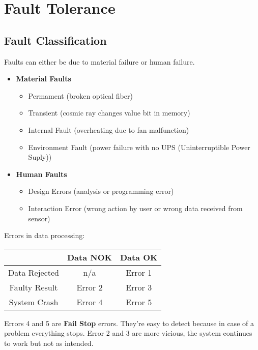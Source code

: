 \documentclass[../main.tex]{subfiles}
\begin{document}
\chapter{Fault Tolerance}

\section{Fault Classification}
Faults can either be due to material failure or human failure. 
\begin{itemize}
	\item \textbf{Material Faults}
	\begin{itemize}
		\item Permament (broken optical fiber)
		\item Transient (cosmic ray changes value bit in memory)
		\item Internal Fault (overheating due to fan malfunction)
		\item Environment Fault (power failure with no UPS (Uninterruptible Power Suply))
	\end{itemize}
	\item \textbf{Human Faults}
	\begin{itemize}
		\item Design Errors (analysis or programming error)
		\item Interaction Error (wrong action by user or wrong data received from sensor)
	\end{itemize}
\end{itemize}
Errors in data processing:
\begin{center}
\begin{tabular}{|c|c|c|}
\hline 
 & Data NOK & Data OK \\ 
\hline 
Data Rejected & n/a & Error 1 \\ 
\hline 
Faulty Result & Error 2 & Error 3 \\ 
\hline 
System Crash & Error 4 & Error 5 \\ 
\hline 
\end{tabular} 
\end{center}
Errors 4 and 5 are  \textbf{Fail Stop} errors. They're easy to detect because in case of a problem everything stops. Error 2 and 3 are more vicious, the system continues to work but not as intended. 
\end{document}
